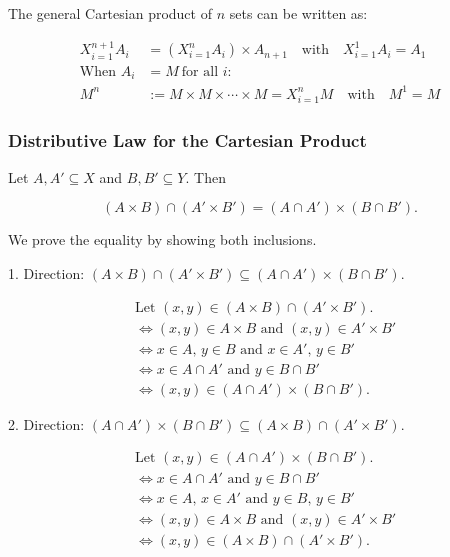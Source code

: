 The general Cartesian product of \(n\) sets can be written as:

\begin{align*}
	X_{i = 1}^{n + 1} A_i & = \left( X_{i = 1}^{n} A_i \right) \times A_{n + 1} \quad \text{with} \quad X_{i = 1}^{1} A_i = A_1 \\
	\text{When } A_i      & = M \ \text{for all } i:                                                                            \\
	M^n                   & := M \times M \times \cdots \times M = X_{i = 1}^{n} M \quad \text{with} \quad M^1 = M
\end{align*}

\subsubsection*{Distributive Law for the Cartesian Product}

Let \(A, A' \subseteq X\) and \(B, B' \subseteq Y\). Then

\[
	(A \times B) \cap (A' \times B') = (A \cap A') \times (B \cap B').
\]

We prove the equality by showing both inclusions.

1. Direction: \((A \times B) \cap (A' \times B') \subseteq (A \cap A') \times (B \cap B')\).

\begin{align*}
	 & \text{Let } (x,y) \in (A \times B) \cap (A' \times B').       \\
	 & \iff (x,y) \in A \times B \text{ and } (x,y) \in A' \times B' \\
	 & \iff x \in A,\, y \in B \text{ and } x \in A',\, y \in B'     \\
	 & \iff x \in A \cap A' \text{ and } y \in B \cap B'             \\
	 & \iff (x,y) \in (A \cap A') \times (B \cap B').
\end{align*}

2. Direction: \((A \cap A') \times (B \cap B') \subseteq (A \times B) \cap (A' \times B')\).

\begin{align*}
	 & \text{Let } (x,y) \in (A \cap A') \times (B \cap B').         \\
	 & \iff x \in A \cap A' \text{ and } y \in B \cap B'             \\
	 & \iff x \in A,\, x \in A' \text{ and } y \in B,\, y \in B'     \\
	 & \iff (x,y) \in A \times B \text{ and } (x,y) \in A' \times B' \\
	 & \iff (x,y) \in (A \times B) \cap (A' \times B').
\end{align*}

